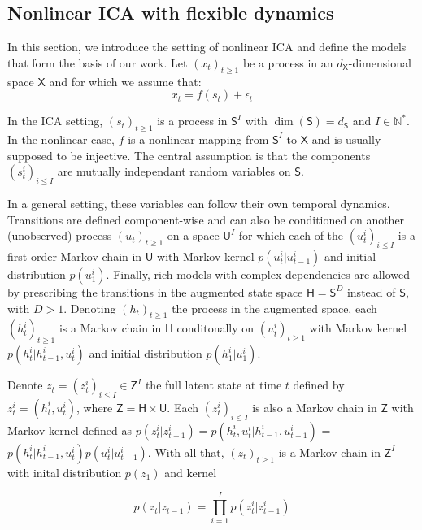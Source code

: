 \documentclass{article}
\newcommand{\1}{\mathbbm{1}}
\begin{document}
\subsection{Nonlinear ICA with flexible dynamics}\label{nonlinear_ica}

In this section, we introduce the setting of nonlinear ICA and define the models that form the basis of our work. Let $(x_t)_{t \geq 1}$ be a process in an $d_\mathsf{X}$-dimensional space $\mathsf{X}$ and for which we assume that:
$$x_t = f(s_t) + \epsilon_t$$

In the ICA setting, $(s_t)_{t \geq 1}$ is a process in $\mathsf{S}^I$ with $\dim(\mathsf{S}) = d_\mathsf{S}$ and $I \in \mathbb{N}^{*}$. In the nonlinear case, $f$ is a nonlinear mapping from $\mathsf{S}^I$ to $\mathsf{X}$ and is usually supposed to be injective. The central assumption is that the components $(s_t^i)_{i \leq I}$ are mutually independant random variables on $\mathsf{S}$.

In a general setting, these variables can follow their own temporal dynamics. Transitions are defined component-wise and can also be conditioned on another (unobserved) process $(u_t)_{t \geq 1}$ on a space $\mathsf{U}^I$ for which each of the $(u_t^i)_{i \leq I}$ is a first order Markov chain in $\mathsf{U}$ with Markov kernel $p(u_t^i|u_{t-1}^i)$ and initial distribution $p(u_1^i)$. Finally, rich models with complex dependencies are allowed by prescribing the transitions in the augmented state space $\mathsf{H} = \mathsf{S}^D$ instead of $\mathsf{S}$, with $D > 1$. Denoting $(h_t)_{t \geq 1}$ the process in the augmented space, each $(h_t^i)_{t \geq 1}$ is a Markov chain in $\mathsf{H}$ conditonally on $(u_t^i)_{t \geq 1}$ with Markov kernel $p(h_t^i|h_{t-1}^i,u_t^i)$ and initial distribution $p(h_1^i|u_1^i)$.

Denote $z_t = (z_t^i)_{i \leq I} \in \mathsf{Z}^I$ the full latent state at time $t$ defined by $z_t^i = (h_t^i, u_t^i)$, where $\mathsf{Z} = \mathsf{H} \times \mathsf{U}$. Each $(z_t^i)_{i \leq I}$ is also a Markov chain in $\mathsf{Z}$ with Markov kernel defined as $p(z_t^i|z_{t-1}^i) = p(h_t^i,u_t^i|h_{t-1}^i, u_{t-1}^i)$ = $p(h_t^i|h_{t-1}^i,u_t^i)p(u_t^i|u_{t-1}^i)$. With all that, $(z_t)_{t \geq 1}$ is a Markov chain in $\mathsf{Z}^I$ with inital distribution $p(z_1)$ and kernel

\begin{equation}\label{kernel_z}
    p(z_t|z_{t-1}) = \prod_{i=1}^I p(z_t^i|z_{t-1}^i)
\end{equation}
\end{document}
